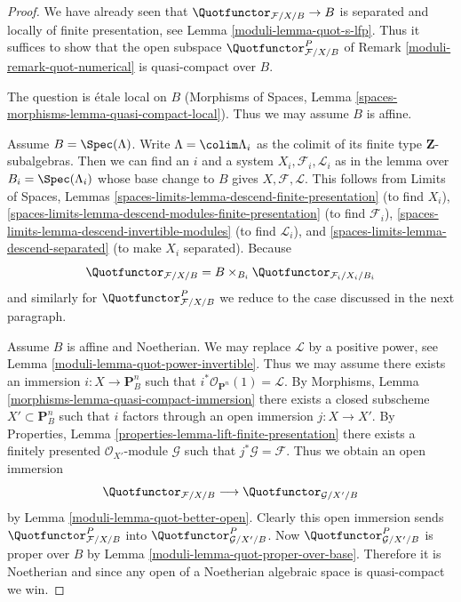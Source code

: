 \begin{proof}

We have already seen that $\Quotfunctor_{\mathcal{F}/X/B} \to B$
is separated and locally of finite presentation, see
Lemma \ref{moduli-lemma-quot-s-lfp}. Thus it suffices to show that
the open subspace $\Quotfunctor^P_{\mathcal{F}/X/B}$
of Remark \ref{moduli-remark-quot-numerical} is quasi-compact over $B$.

\medskip\noindent
The question is \'etale local on $B$
(Morphisms of Spaces, Lemma \ref{spaces-morphisms-lemma-quasi-compact-local}).
Thus we may assume $B$ is affine.

\medskip\noindent
Assume $B = \Spec(\Lambda)$. Write $\Lambda = \colim \Lambda_i$ as the
colimit of its finite type $\mathbf{Z}$-subalgebras. Then
we can find an $i$ and a system $X_i, \mathcal{F}_i, \mathcal{L}_i$
as in the lemma over $B_i = \Spec(\Lambda_i)$ whose base change to
$B$ gives $X, \mathcal{F}, \mathcal{L}$.
This follows from
Limits of Spaces, Lemmas
\ref{spaces-limits-lemma-descend-finite-presentation} (to find $X_i$),
\ref{spaces-limits-lemma-descend-modules-finite-presentation} (to find
$\mathcal{F}_i$), \ref{spaces-limits-lemma-descend-invertible-modules}
(to find $\mathcal{L}_i$), and \ref{spaces-limits-lemma-descend-separated}
(to make $X_i$ separated). Because
$$
\Quotfunctor_{\mathcal{F}/X/B} = B \times_{B_i}
\Quotfunctor_{\mathcal{F}_i/X_i/B_i}
$$
and similarly for $\Quotfunctor^P_{\mathcal{F}/X/B}$ we reduce
to the case discussed in the next paragraph.

\medskip\noindent
Assume $B$ is affine and Noetherian. We may replace $\mathcal{L}$
by a positive power, see Lemma \ref{moduli-lemma-quot-power-invertible}.
Thus we may assume there exists an immersion $i : X \to \mathbf{P}^n_B$
such that $i^*\mathcal{O}_{\mathbf{P}^n}(1) = \mathcal{L}$. By
Morphisms, Lemma \ref{morphisms-lemma-quasi-compact-immersion}
there exists a closed subscheme $X' \subset \mathbf{P}^n_B$
such that $i$ factors through an open immersion $j : X \to X'$.
By Properties, Lemma \ref{properties-lemma-lift-finite-presentation}
there exists a finitely presented $\mathcal{O}_{X'}$-module
$\mathcal{G}$ such that $j^*\mathcal{G} = \mathcal{F}$.
Thus we obtain an open immersion
$$
\Quotfunctor_{\mathcal{F}/X/B}
\longrightarrow
\Quotfunctor_{\mathcal{G}/X'/B}
$$
by Lemma \ref{moduli-lemma-quot-better-open}. Clearly this open immersion
sends $\Quotfunctor^P_{\mathcal{F}/X/B}$ into
$\Quotfunctor^P_{\mathcal{G}/X'/B}$. Now
$\Quotfunctor^P_{\mathcal{G}/X'/B}$ is proper over $B$ by
Lemma \ref{moduli-lemma-quot-proper-over-base}.
Therefore it is Noetherian and since any open of a Noetherian
algebraic space is quasi-compact we win.
\end{proof}


